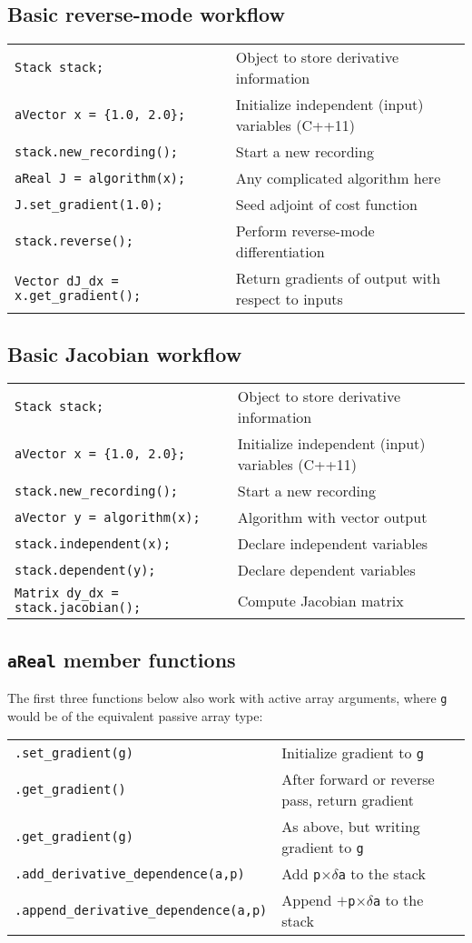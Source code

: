 \documentclass[10pt,a4,landscape]{article}
\def\code#1{\texttt{#1}}
\begin{document}
\subsection*{Basic reverse-mode workflow}
\begin{tabular}{ll}
\code{Stack stack;} & Object to store derivative information\\
\code{aVector x = \{1.0, 2.0\};} & Initialize independent (input) variables (C++11)\\
\code{stack.new\_recording();} & Start a new recording\\
\code{aReal J = algorithm(x);} & Any complicated algorithm here\\
\code{J.set\_gradient(1.0);} & Seed adjoint of cost function\\
\code{stack.reverse();} & Perform reverse-mode differentiation\\
\code{Vector dJ\_dx = x.get\_gradient();} & Return gradients of output with respect to inputs\\
\end{tabular}


\subsection*{Basic Jacobian workflow}
\begin{tabular}{ll}
\code{Stack stack;} & Object to store derivative information\\
\code{aVector x = \{1.0, 2.0\};} & Initialize independent (input) variables (C++11)\\
\code{stack.new\_recording();} & Start a new recording\\
\code{aVector y = algorithm(x);} & Algorithm with vector output\\
\code{stack.independent(x);} & Declare independent variables \\
\code{stack.dependent(y);} & Declare dependent variables\\
\code{Matrix dy\_dx = stack.jacobian();} & Compute Jacobian matrix\\
\end{tabular}
\subsection*{\code{aReal} member functions}
The first three functions below also work with active array arguments, where
\code{g} would be of the equivalent passive array type:\\
\begin{tabular}{ll}
\code{.set\_gradient(g)} & Initialize gradient to \code{g} \\
\code{.get\_gradient()} & After forward or reverse pass, return gradient\\
\code{.get\_gradient(g)} & As above, but writing gradient to \code{g}\\
\code{.add\_derivative\_dependence(a,p)} & Add \code{p}$\times\delta$\code{a} to the stack\\
\code{.append\_derivative\_dependence(a,p)} & Append $+$\code{p}$\times\delta$\code{a} to the stack\\
\end{tabular}
\end{document}
